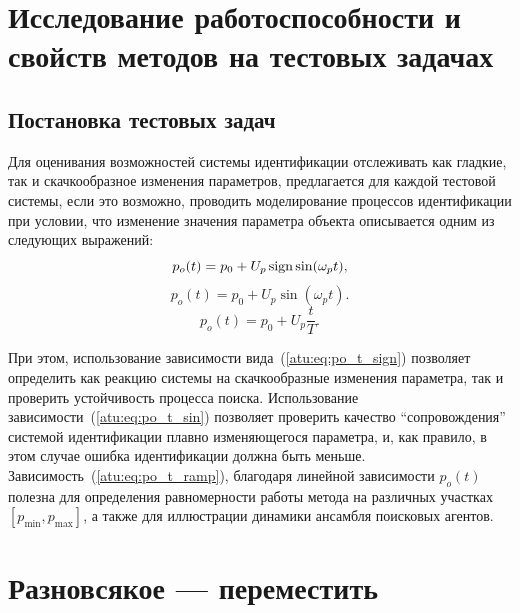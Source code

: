 




\section{Исследование работоспособности и свойств методов на тестовых задачах}  %

\subsection{Постановка тестовых задач}


Для оценивания возможностей системы идентификации
отслеживать как гладкие, так и скачкообразное изменения параметров,
предлагается для каждой тестовой системы, если это возможно,
проводить моделирование процессов идентификации при условии, что
изменение значения параметра объекта описывается одним из
следующих выражений:
%
\begin{equation}
  p_o(t) = p_0 +  U_{p} \operatorname*{sign} \sin( \omega_{p} t ),
  \label{atu:eq:po_t_sign}
\end{equation}
%
%
\begin{equation}
  p_o(t) = p_0 +  U_{p} \sin( \omega_{p} t ).
  \label{atu:eq:po_t_sin}
\end{equation}
%
\begin{equation}
  p_o(t) = p_0 +  U_{p} \frac{t}{T}.
  \label{atu:eq:po_t_ramp}
\end{equation}


При этом, использование зависимости вида~(\ref{atu:eq:po_t_sign})
позволяет определить как реакцию системы на скачкообразные
изменения параметра, так и проверить устойчивость процесса поиска.
Использование зависимости~(\ref{atu:eq:po_t_sin}) позволяет проверить
качество ``сопровождения'' системой идентификации плавно изменяющегося параметра,
и, как правило, в этом случае ошибка идентификации должна быть меньше.
Зависимость~(\ref{atu:eq:po_t_ramp}), благодаря линейной зависимости $p_o(t)$
полезна для определения
равномерности работы метода на различных участках $[p_{\min}, p_{\max}]$,
а также для иллюстрации динамики ансамбля поисковых агентов.



\section{Разновсякое --- переместить}  %



